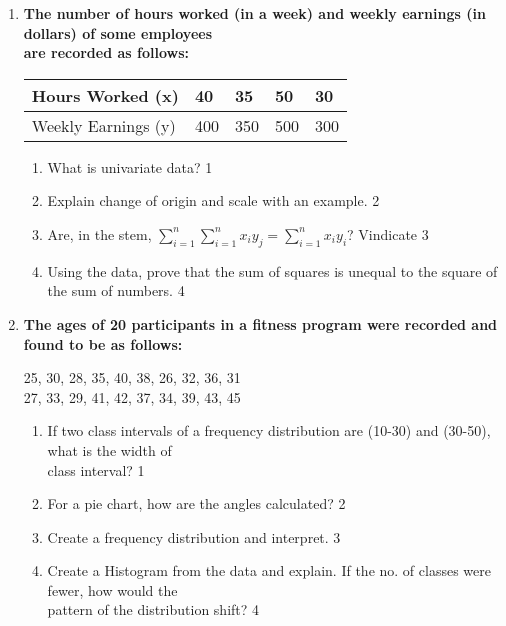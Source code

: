 \documentclass{article}
\begin{document}
\begin{enumerate}
\item
\textbf{The number of hours worked (in a week) and weekly earnings 
(in dollars) of some employees \\ are recorded as follows:}

\begin{table}[!h]
\begin{center}
\begin{tabular}{l|l|l|l|l}
Hours Worked (x)  & 40 & 35 & 50 & 30 \\ \hline
Weekly Earnings (y) & 400  & 350  & 500 & 300 \\ 
\end{tabular}
\end{center}
\end{table}

\begin{enumerate}
    \item What is univariate data? \hfill 1
    \item Explain change of origin and scale with an example. \hfill 2
    \item
    Are, in the stem, $\displaystyle \sum_{i=1}^{n} 
    \sum_{i=1}^{n} x_iy_j = \sum_{i=1}^{n} x_iy_i$? Vindicate \hfill 3
    \item
    Using the data, prove that the sum of squares is unequal 
    to the square of the sum of numbers. \hfill 4
\end{enumerate}

  \item
  \textbf{The ages of 20 participants in a fitness program were recorded and 
  found to be as follows:}
  \begin{center}
  25, 30, 28, 35, 40, 38, 26, 32, 36, 31 \\
  27, 33, 29, 41, 42, 37, 34, 39, 43, 45 \\
  \end{center}

  
  \begin{enumerate}
     \item If two class intervals of a frequency distribution are (10-30) and 
 (30-50), what is the width of \\ class interval? \hfill 1
  \item For a pie chart, how are the angles calculated? \hfill 2
    \item  
	 Create a frequency distribution and interpret. \hfill 3
    \item
	Create a Histogram from the data and explain. If the no. of 
	classes were fewer, how would the \\ pattern of the distribution shift? \hfill 4
  \end{enumerate}
  

\end{enumerate}
\end{document}
